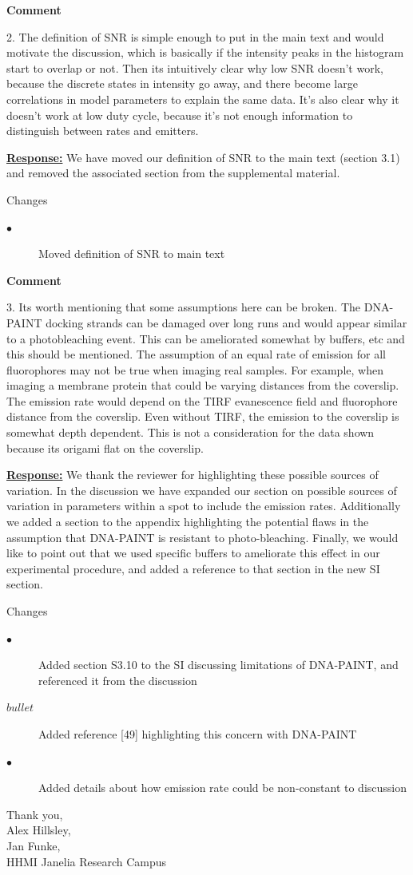 \documentclass{article}
\begin{document}
\textbf{Comment}

2. The definition of SNR is simple enough to put in the main text and would motivate the discussion, 
which is basically if the intensity peaks in the histogram start to overlap or not. 
Then its intuitively clear why low SNR doesn’t work, because the discrete states in 
intensity go away, and there become large correlations in model parameters to explain the same data. 
It’s also clear why it doesn’t work at low duty cycle, because it’s not enough information to 
distinguish between rates and emitters.

\underline{\textbf{Response:}}
We have moved our definition of SNR to the main text (section 3.1) and removed the associated section from the 
supplemental material.

Changes
\begin{description}
    \item[$\bullet$] Moved definition of SNR to main text
\end{description}

\textbf{Comment}

3. Its worth mentioning  that some assumptions here can be broken. 
The DNA-PAINT docking strands can be damaged over long runs and would appear 
similar to a photobleaching event. 
This can be ameliorated somewhat by buffers, etc and this should be mentioned. 
The assumption of an equal rate of emission for all fluorophores may not be true when imaging real samples. 
For example, when imaging a membrane protein that could be varying distances from the coverslip. 
The emission rate would depend on the TIRF evanescence field and fluorophore distance from the coverslip. 
Even without TIRF, the emission to the coverslip is somewhat depth dependent. 
This is not a consideration for the data shown because its origami flat on the coverslip.

\underline{\textbf{Response:}}
We thank the reviewer for highlighting these possible sources of variation. In the discussion we have expanded our 
section on possible sources of variation in parameters within a spot to include the emission rates. Additionally 
we added a section to the appendix highlighting the potential flaws in the assumption that DNA-PAINT is resistant 
to photo-bleaching. Finally, we would like to point out that we used specific buffers to ameliorate this effect in 
our experimental procedure, and added a reference to that section in the new SI section. 

Changes
\begin{description}
    \item[$\bullet$] Added section S3.10 to the SI discussing limitations of DNA-PAINT, and referenced 
    it from the discussion
    \item[$bullet$] Added reference [49] highlighting this concern with DNA-PAINT
    \item[$\bullet$] Added details about how emission rate could be non-constant to discussion
\end{description}

% 
% 

\vspace{5mm}
Thank you, \\
Alex Hillsley,\\
Jan Funke,\\
HHMI Janelia Research Campus
\end{document}
